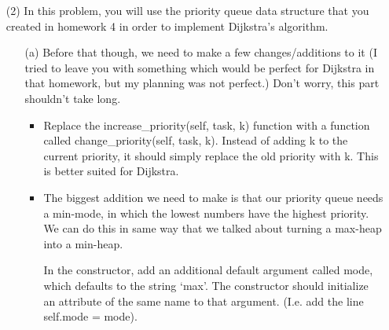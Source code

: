 \documentclass[12pt]{article}
\begin{document}
\begin{enumerate}
\begin{center}
    \end{center}
    \item[(2)] In this problem, you will use the priority queue data structure that you created in homework 4 in order to implement Dijkstra's algorithm. 
    \begin{itemize}
        \item[(a)] Before that though, we need to make a few changes/additions to it (I tried to leave you with something which would be perfect for Dijkstra in that homework, but my planning was not perfect.) Don't worry, this part shouldn't take long.
        \begin{itemize}
            \item Replace the increase\_priority(self, task, k) function with a function called change\_priority(self, task, k). Instead of adding k to the current priority, it should simply replace the old priority with k. This is better suited for Dijkstra. 
            \item The biggest addition we need to make is that our priority queue needs a min-mode, in which the lowest numbers have the highest priority. We can do this in same way that we talked about turning a max-heap into a min-heap. 
            
            In the constructor, add an additional default argument called mode, which defaults to the string `max'. The constructor should initialize an attribute of the same name to that argument. (I.e. add the line self.mode = mode). 


\end{itemize}
\end{itemize}
\end{enumerate}
\end{document}

